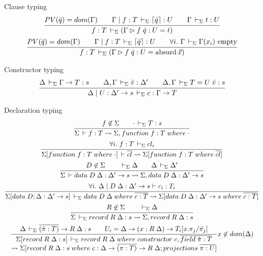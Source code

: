 \documentclass[acmlarge,fleqn]{acmart}\settopmatter{}
\begin{document}
Clause typing 
\begin{gather*}
\ru{PV(\bar{q}) = dom(\Gamma) \qquad
    \Gamma \mid f : T \ders \lceil \bar{q} \rceil : U \qquad
    \Gamma \ders t : U}
   {f : T \ders (\Gamma \rhd f\; \bar{q} : U = t)}
\\
\ru{PV(\bar{q}) = dom(\Gamma) \qquad
    \Gamma \mid f : T \ders \lceil \bar{q} \rceil : U \qquad
    \forall i.\ \Gamma \ders \Gamma(x_i) \mempty}
   {f : T \ders (\Gamma \rhd f\; \bar{q} : U = \absurd \vec x)}
\end{gather*}

Constructor typing 
\begin{gather*}
\ru{\Delta \ders \Gamma \to T : s \qquad
    \Delta,\Gamma \ders \bar{v} : \Delta' \qquad
    \Delta,\Gamma \ders T = U\; \bar{v} : s}
   {\Delta \mid U : \Delta' \to s \ders c : \Gamma \to T}
\end{gather*}

Declaration typing 
\begin{gather*}
\ru{f \not\in \Sigma \qquad \cdot \ders T : s}
   {\Sigma \der f : T \leadsto \Sigma, function\; f : T\; where\; \cdot}
\\
\ru{\forall i.\; f : T \ders cl_i}
   {\Sigma[function\; f : T\; where\; \cdot] \der \overline{cl} \leadsto \Sigma[function\; f : T\; where\; \overline{cl}]}
\\
\ru{D \not\in \Sigma \qquad \ders \Delta \qquad \Delta \ders \Delta'}
   {\Sigma \der data\; D\; \Delta : \Delta' \to s \leadsto \Sigma, data\; D\; \Delta : \Delta' \to s}
\\
\ru{\forall i.\; \Delta \mid D\; \Delta : \Delta' \to s \vdash c_i : T_i}
   {\Sigma[data\; D; \Delta : \Delta' \to s] \ders data\; D\; \Delta\; where\; \overline{c : T} \leadsto \Sigma[data\; D\; \Delta : \Delta' \to s\; where\; \overline{c : T}]}
\\
\ru{R \not\in \Sigma \qquad \ders \Delta}
   {\Sigma \ders record\; R \; \Delta : s \leadsto \Sigma, record\; R\; \Delta : s}
\\
\ru{\Delta \ders \overline{(\hat{\pi} : T)} \to R\; \Delta : s \qquad
    U_i = \Delta \to (x : R\; \Delta) \to T_i[x.\pi_j / \hat{\pi_j}] }
   {\Sigma[record\; R\; \Delta : s] \ders record\; R\; \Delta\; where\; constructor\; c, \overline{field\; \hat{\pi} : T} \\  \leadsto \Sigma[record\; R\; \Delta : s\; where\; c : \Delta \to \overline{(\pi : T)} \to R\; \Delta; projections\; \overline{\pi : U}]} x \not\in dom(\Delta)
\end{gather*}
\end{document}
